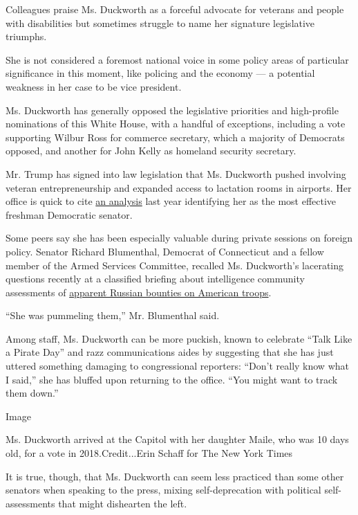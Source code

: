 Colleagues praise Ms. Duckworth as a forceful advocate for veterans and
people with disabilities but sometimes struggle to name her signature
legislative triumphs.

She is not considered a foremost national voice in some policy areas of
particular significance in this moment, like policing and the economy
--- a potential weakness in her case to be vice president.

Ms. Duckworth has generally opposed the legislative priorities and
high-profile nominations of this White House, with a handful of
exceptions, including a vote supporting Wilbur Ross for commerce
secretary, which a majority of Democrats opposed, and another for John
Kelly as homeland security secretary.

Mr. Trump has signed into law legislation that Ms. Duckworth pushed
involving veteran entrepreneurship and expanded access to lactation
rooms in airports. Her office is quick to cite
\href{https://news.vanderbilt.edu/2019/02/28/grassley-klobuchar-most-effective-senators-of-115th-congress-according-to-study/}{an
analysis} last year identifying her as the most effective freshman
Democratic senator.

Some peers say she has been especially valuable during private sessions
on foreign policy. Senator Richard Blumenthal, Democrat of Connecticut
and a fellow member of the Armed Services Committee, recalled Ms.
Duckworth's lacerating questions recently at a classified briefing about
intelligence community assessments of
\href{https://www.nytimes.com/2020/06/26/us/politics/russia-afghanistan-bounties.html}{apparent
Russian bounties on American troops}.

``She was pummeling them,'' Mr. Blumenthal said.

Among staff, Ms. Duckworth can be more puckish, known to celebrate
``Talk Like a Pirate Day'' and razz communications aides by suggesting
that she has just uttered something damaging to congressional reporters:
``Don't really know what I said,'' she has bluffed upon returning to the
office. ``You might want to track them down.''

Image

Ms. Duckworth arrived at the Capitol with her daughter Maile, who was 10
days old, for a vote in 2018.Credit...Erin Schaff for The New York Times

It is true, though, that Ms. Duckworth can seem less practiced than some
other senators when speaking to the press, mixing self-deprecation with
political self-assessments that might dishearten the left.

